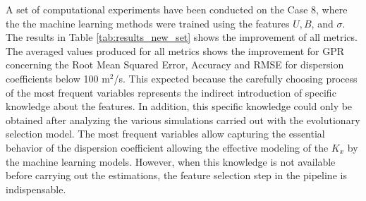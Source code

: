 \documentclass[a4paper,12pt, english]{article}
\begin{document}
A set of computational experiments have been conducted on the Case 8, 
where the the machine learning methods were trained using the  features  $U, B$, and $\sigma$.
The results in Table \ref{tab:results_new_set} shows the improvement of all metrics. 
The averaged values produced for all metrics shows the improvement for GPR  concerning the Root Mean Squared Error, Accuracy and RMSE for dispersion coefficients below 100 m$^2$/s.
% 
This expected because the carefully choosing process of the most frequent variables  represents the indirect introduction of specific knowledge about the features. 
In addition, this specific knowledge could only be obtained after analyzing the various simulations carried out with the evolutionary selection model.
The most frequent variables allow capturing the essential behavior of the dispersion coefficient allowing the effective modeling of the $K_x$ by the machine learning models. 
However, when this knowledge is not available before carrying out the estimations, the feature selection step in the pipeline is indispensable.
\end{document}
